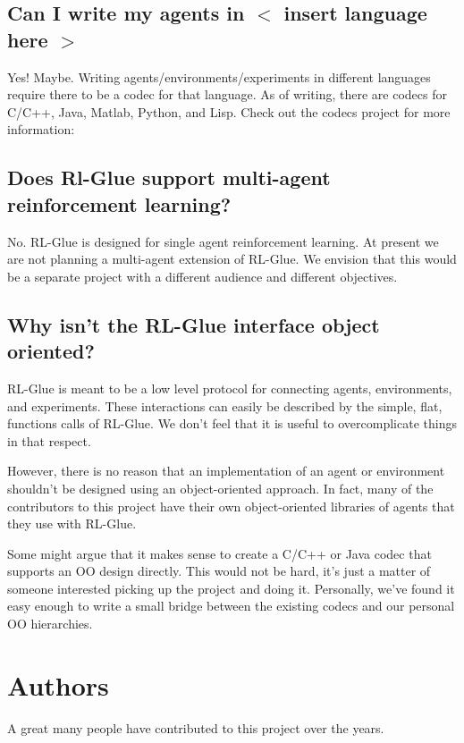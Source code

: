 \documentclass[11pt]{article}
\begin{document}
\subsection{Can I write my agents in $<$ insert language here $>$}
Yes! Maybe.  Writing agents/environments/experiments in different languages require there to be a codec for that language.  As of writing, there are codecs for C/C++, Java, Matlab, Python, and Lisp.  Check out the codecs project for more information:\newline
{}

\subsection{Does Rl-Glue support multi-agent reinforcement learning?}
 No. RL-Glue is designed for single agent reinforcement learning. At present we are not planning a multi-agent extension of RL-Glue. We envision that this would be a separate project with a different audience and different objectives.  
 
\subsection{Why isn't the RL-Glue interface object oriented?}
RL-Glue is meant to be a low level protocol for connecting agents, environments, and experiments.  These interactions can
easily be described by the simple, flat, functions calls of RL-Glue.  We don't feel that it is useful to overcomplicate
things in that respect.

However, there is no reason that an implementation of an agent or environment shouldn't be designed using an object-oriented 
approach.  In fact, many of the contributors to this project have their own object-oriented libraries of agents that 
they use with RL-Glue.

Some might argue that it makes sense to create a C/C++ or Java codec that supports an OO design
directly.  This would not be hard, it's just a matter of someone interested picking up the project and doing it.  Personally, 
we've found it easy enough to write a small bridge between the existing codecs and our personal OO hierarchies.

\section{Authors}
A great many people have contributed to this project over the years.
\end{document}
